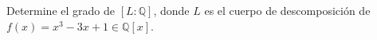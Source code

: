 Determine el grado de $[L:\mathbb{Q}]$, donde $L$ es el cuerpo de descomposición de $f(x)=x^3-3x+1\in\mathbb{Q}[x]$.
